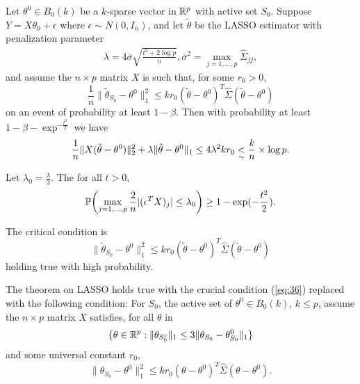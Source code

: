 \begin{thm}
  Let $\theta^{0} \in B_{0}(k)$ be a $k$-sparse vector in $\mathbb{R}^{p}$
  with active set $S_{0}$.  Suppose $Y = X \theta_{0} + \epsilon$
  where $\epsilon \sim N(0, I_{n})$, and let $\tilde \theta$ be the
  LASSO estimator with penalization parameter
  \begin{align}
    \label{eq:31}
    \lambda = 4 \overline \sigma \sqrt{\frac{t^{2} + 2 \log p}{n} },
    \overline \sigma^{2} = \max_{j = 1, \dots, p} \hat \Sigma_{jj},
  \end{align} and assume the $n \times p$ matrix $X$ is such that, for
  some $r_{0} > 0$,
  \begin{equation}
    \label{eq:33}
    \frac{1}{n} \| \tilde \theta_{S_{0}} - \theta^{0} \|_{1}^{2} \leq
    k r_{0}(\tilde \theta - \theta^{0})^{T} \hat \Sigma (\tilde \theta
    - \theta^{0})
  \end{equation} on an event of probability at least $1 - \beta$.
  Then with probability at least $1 - \beta - \exp^{-\frac{t^{2}}{2}}$
  we have
  \begin{align}
    \label{eq:34}
    \frac{1}{n} \| X(\tilde \theta - \theta^{0}) \|_{2}^{2} + \lambda
    \| \tilde \theta - \theta^{0} \|_{1} \leq 4 \lambda^{2} k r_{0}
    \underset{\sim}{<} \frac{k}{n} \times \log p.
  \end{align}
\end{thm}

\begin{lem}
  Let $\lambda_{0} = \frac{\lambda}{2}$.  The for all $t > 0$,
  \begin{equation}
    \label{eq:35}
    \Prob{\max_{j = 1, \dots, p} \frac{2}{n} |(\epsilon^{T} X)_{j}|
      \leq \lambda_{0}} \geq 1 - \exp(-\frac{t^{2}}{2}).
  \end{equation}
\end{lem}

The critical condition is
\begin{equation}
  \label{eq:36}
  \| \tilde \theta_{S_{0}} - \theta^{0} \|_{1}^{2} \leq k r_{0}(\tilde
  \theta - \theta^{0})^{T} \hat \Sigma (\tilde \theta - \theta^{0})
\end{equation} holding true with high probability.

\begin{thm}
  The theorem on LASSO holds true with the crucial condition
  (\ref{eq:36}) replaced with the following condition: For $S_{0}$,
  the active set of $\theta^{0} \in B_{0}(k)$, $k \leq p$, assume the
  $n \times p$ matrix $X$ satisfies, for all $\theta$ in
  \begin{equation}
    \label{eq:37}
    \{ \theta \in \mathbb{R}^{p} : \| \theta_{S_{0}^{c}} \|_{1} \leq 3 \|
    \theta_{S_{0}} - \theta_{S_{0}}^{0} \|_{1} \} 
  \end{equation} and some universal constant $r_{0}$,
  \begin{equation}
    \label{eq:38}
    \| \theta_{S_{0}} - \theta^{0} \|_{1}^{2} \leq k r_{0} (\theta -
    \theta^{0})^{T} \hat \Sigma (\theta - \theta^{0}).
  \end{equation}
\end{thm}

